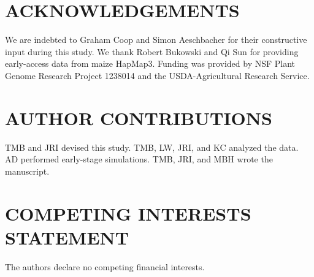 \documentclass[12pt,a4paper]{article}
\begin{document}
\section*{ACKNOWLEDGEMENTS}
We are indebted to Graham Coop and Simon Aeschbacher for their constructive input during this study. We thank Robert Bukowski and Qi Sun for providing early-access data from maize HapMap3. Funding was provided by NSF Plant Genome Research Project 1238014 and the USDA-Agricultural Research Service.

\section*{AUTHOR CONTRIBUTIONS}
TMB and JRI devised this study. TMB, LW, JRI, and KC analyzed the data. AD performed early-stage simulations. TMB, JRI, and MBH wrote the manuscript.

\section*{COMPETING INTERESTS STATEMENT}
The authors declare no competing financial interests.
\end{document}
